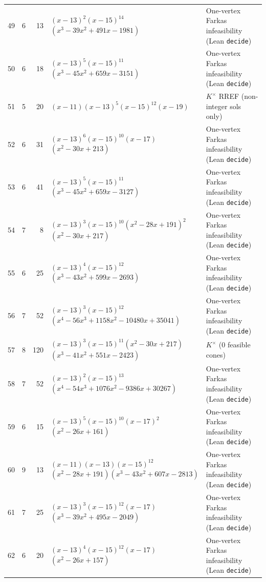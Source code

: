\documentclass[11pt,reqno]{amsart}
\theoremstyle{definition}
\theoremstyle{remark}
\numberwithin{equation}{section}
\numberwithin{table}{section}
\begin{document}
{\begin{longtable}{@{}rrr>{\raggedright\arraybackslash}p{2.50in}>{\raggedright\arraybackslash}p{2.30in}@{}}
49 & 6 & 13 & $(x-13)^2$\allowbreak $(x-15)^{14}$\allowbreak $(x^3-39x^2+491x-1981)$ & One-vertex Farkas infeasibility (Lean \texttt{decide}) \\
50 & 6 & 18 & $(x-13)^5$\allowbreak $(x-15)^{11}$\allowbreak $(x^3-45x^2+659x-3151)$ & One-vertex Farkas infeasibility (Lean \texttt{decide}) \\
51 & 5 & 20 & $(x-11)$\allowbreak $(x-13)^5$\allowbreak $(x-15)^{12}$\allowbreak $(x-19)$ & $K^\times$ RREF (non-integer sols only) \\
52 & 6 & 31 & $(x-13)^6$\allowbreak $(x-15)^{10}$\allowbreak $(x-17)$\allowbreak $(x^2-30x+213)$ & One-vertex Farkas infeasibility (Lean \texttt{decide}) \\
53 & 6 & 41 & $(x-13)^5$\allowbreak $(x-15)^{11}$\allowbreak $(x^3-45x^2+659x-3127)$ & One-vertex Farkas infeasibility (Lean \texttt{decide}) \\
54 & 7 & 8 & $(x-13)^3$\allowbreak $(x-15)^{10}$\allowbreak $(x^2-28x+191)^2$\allowbreak $(x^2-30x+217)$ & One-vertex Farkas infeasibility (Lean \texttt{decide}) \\
55 & 6 & 25 & $(x-13)^4$\allowbreak $(x-15)^{12}$\allowbreak $(x^3-43x^2+599x-2693)$ & One-vertex Farkas infeasibility (Lean \texttt{decide}) \\
56 & 7 & 52 & $(x-13)^3$\allowbreak $(x-15)^{12}$\allowbreak $(x^4-56x^3+1158x^2-10480x+35041)$ & One-vertex Farkas infeasibility (Lean \texttt{decide}) \\
57 & 8 & 120 & $(x-13)^3$\allowbreak $(x-15)^{11}$\allowbreak $(x^2-30x+217)$\allowbreak $(x^3-41x^2+551x-2423)$ & $K^\times$ ($0$ feasible cones) \\
58 & 7 & 52 & $(x-13)^2$\allowbreak $(x-15)^{13}$\allowbreak $(x^4-54x^3+1076x^2-9386x+30267)$ & One-vertex Farkas infeasibility (Lean \texttt{decide}) \\
59 & 6 & 15 & $(x-13)^5$\allowbreak $(x-15)^{10}$\allowbreak $(x-17)^2$\allowbreak $(x^2-26x+161)$ & One-vertex Farkas infeasibility (Lean \texttt{decide}) \\
60 & 9 & 13 & $(x-11)$\allowbreak $(x-13)$\allowbreak $(x-15)^{12}$\allowbreak $(x^2-28x+191)$\allowbreak $(x^3-43x^2+607x-2813)$ & One-vertex Farkas infeasibility (Lean \texttt{decide}) \\
61 & 7 & 25 & $(x-13)^3$\allowbreak $(x-15)^{12}$\allowbreak $(x-17)$\allowbreak $(x^3-39x^2+495x-2049)$ & One-vertex Farkas infeasibility (Lean \texttt{decide}) \\
62 & 6 & 20 & $(x-13)^4$\allowbreak $(x-15)^{12}$\allowbreak $(x-17)$\allowbreak $(x^2-26x+157)$ & One-vertex Farkas infeasibility (Lean \texttt{decide}) \\

\end{longtable}}
\end{document}
